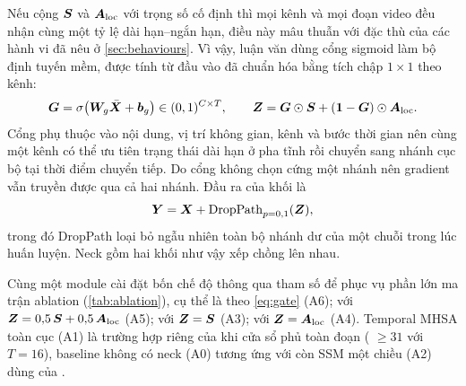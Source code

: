 Nếu cộng $\bm{S}$ và $\bm{A}_{\text{loc}}$ với trọng số cố định thì mọi kênh và mọi đoạn video đều nhận cùng một tỷ lệ dài hạn--ngắn hạn, điều này mâu thuẫn với đặc thù của các hành vi đã nêu ở \cref{sec:behaviours}. Vì vậy, luận văn dùng cổng sigmoid làm bộ định tuyến mềm, được tính từ đầu vào đã chuẩn hóa bằng tích chập $1 \times 1$ theo kênh:
\begin{equation}
\bm{G} = \sigma\big(\bm{W}_g \bar{\bm{X}} + \bm{b}_g\big) \in (0,1)^{C \times T}, \qquad
\bm{Z} = \bm{G} \odot \bm{S} + (\bm{1} - \bm{G}) \odot \bm{A}_{\text{loc}}.
\label{eq:gate}
\end{equation}
Cổng phụ thuộc vào nội dung, vị trí không gian, kênh và bước thời gian nên cùng một kênh có thể ưu tiên trạng thái dài hạn ở pha tĩnh rồi chuyển sang nhánh cục bộ tại thời điểm chuyển tiếp. Do cổng không chọn cứng một nhánh nên gradient vẫn truyền được qua cả hai nhánh. Đầu ra của khối là
\begin{equation}
\bm{Y} = \bm{X} + \mathrm{DropPath}_{p = 0{,}1}(\bm{Z}),
\label{eq:residual}
\end{equation}
trong đó DropPath \cite{huang2016droppath} loại bỏ ngẫu nhiên toàn bộ nhánh dư của một chuỗi trong lúc huấn luyện. Neck gồm hai khối như vậy xếp chồng lên nhau.

Cùng một module cài đặt bốn chế độ thông qua tham số  để phục vụ phần lớn ma trận ablation (\cref{tab:ablation}), cụ thể là  theo \cref{eq:gate} (A6);  với $\bm{Z} = 0{,}5\,\bm{S} + 0{,}5\,\bm{A}_{\text{loc}}$ (A5);  với $\bm{Z} = \bm{S}$ (A3);  với $\bm{Z} = \bm{A}_{\text{loc}}$ (A4). Temporal MHSA toàn cục (A1) là trường hợp riêng của  khi cửa sổ phủ toàn đoạn ( $\geq 31$ với $T = 16$), baseline không có neck (A0) tương ứng với  còn SSM một chiều (A2) dùng  của .

